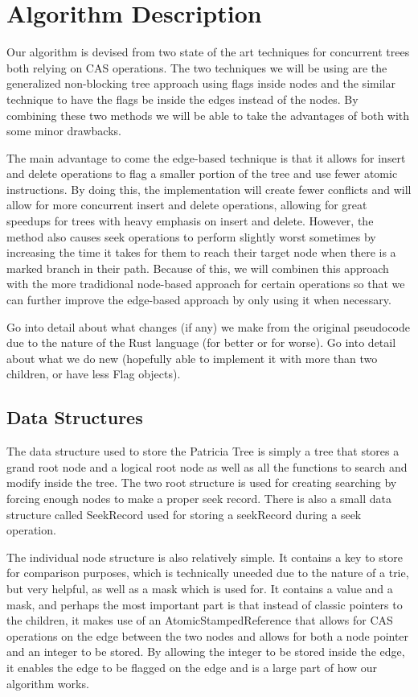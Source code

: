 \documentclass[conference]{IEEEtran}
\begin{document}
\section{Algorithm Description}
Our algorithm is devised from two state of the art techniques for concurrent trees both relying on CAS operations. The two techniques we will be using are the generalized non-blocking tree approach using flags inside nodes \cite{Shafiei2013,Brown2014} and the similar technique to have the flags be inside the edges instead of the nodes. \cite{Natarajan2014} By combining these two methods we will be able to take the advantages of both with some minor drawbacks.
\par
The main advantage to come the edge-based technique is that it allows for insert and delete operations to flag a smaller portion of the tree and use fewer atomic instructions. \cite{Natarajan2014} By doing this, the implementation will create fewer conflicts and will allow for more concurrent insert and delete operations, allowing for great speedups for trees with heavy emphasis on insert and delete. However, the method also causes seek operations to perform slightly worst sometimes by increasing the time it takes for them to reach their target node when there is a marked branch in their path. Because of this, we will combinen this approach with the more tradidional node-based approach for certain operations so that we can further improve the edge-based approach by only using it when necessary. 

Go into detail about what changes (if any) we make from the original pseudocode due to the nature of the Rust language (for better or for worse). Go into detail about what we do new (hopefully able to implement it with more than two children, or have less Flag objects).


\subsection{Data Structures}
The data structure used to store the Patricia Tree is simply a tree that stores a grand root node and a logical root node as well as all the functions to search and modify inside the tree. The two root structure is used for creating searching by forcing enough nodes to make a proper seek record. There is also a small data structure called SeekRecord used for storing a seekRecord during a seek operation.
\par
The individual node structure is also relatively simple. It contains a key to store for comparison purposes, which is technically uneeded due to the nature of a trie, but very helpful, as well as a mask which is used for. It contains a value and a mask, and perhaps the most important part is that instead of classic pointers to the children, it makes use of an AtomicStampedReference that allows for CAS operations on the edge between the two nodes and allows for both a node pointer and an integer to be stored. By allowing the integer to be stored inside the edge, it enables the edge to be flagged on the edge and is a large part of how our algorithm works.
\end{document}

